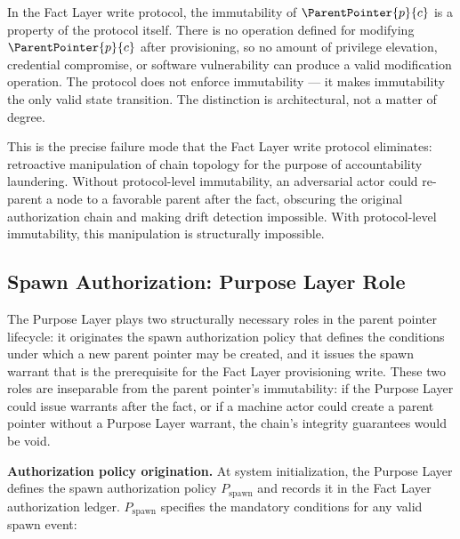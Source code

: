 \documentclass[12pt]{article}
\begin{document}
In the Fact Layer write protocol, the immutability of $\ParentPointer{p}{c}$ is a property of the protocol itself. There is no operation defined for modifying $\ParentPointer{p}{c}$ after provisioning, so no amount of privilege elevation, credential compromise, or software vulnerability can produce a valid modification operation. The protocol does not enforce immutability — it makes immutability the only valid state transition. The distinction is architectural, not a matter of degree.

This is the precise failure mode that the Fact Layer write protocol eliminates: retroactive manipulation of chain topology for the purpose of accountability laundering. Without protocol-level immutability, an adversarial actor could re-parent a node to a favorable parent after the fact, obscuring the original authorization chain and making drift detection impossible. With protocol-level immutability, this manipulation is structurally impossible.

\subsection{Spawn Authorization: Purpose Layer Role}
\label{sec:purpose-layer-authorization}

The Purpose Layer plays two structurally necessary roles in the parent pointer lifecycle: it originates the spawn authorization policy that defines the conditions under which a new parent pointer may be created, and it issues the spawn warrant that is the prerequisite for the Fact Layer provisioning write. These two roles are inseparable from the parent pointer's immutability: if the Purpose Layer could issue warrants after the fact, or if a machine actor could create a parent pointer without a Purpose Layer warrant, the chain's integrity guarantees would be void.

\medskip
\noindent\textbf{Authorization policy origination.} At system initialization, the Purpose Layer defines the spawn authorization policy $P_{\mathrm{spawn}}$ and records it in the Fact Layer authorization ledger. $P_{\mathrm{spawn}}$ specifies the mandatory conditions for any valid spawn event:
\end{document}
